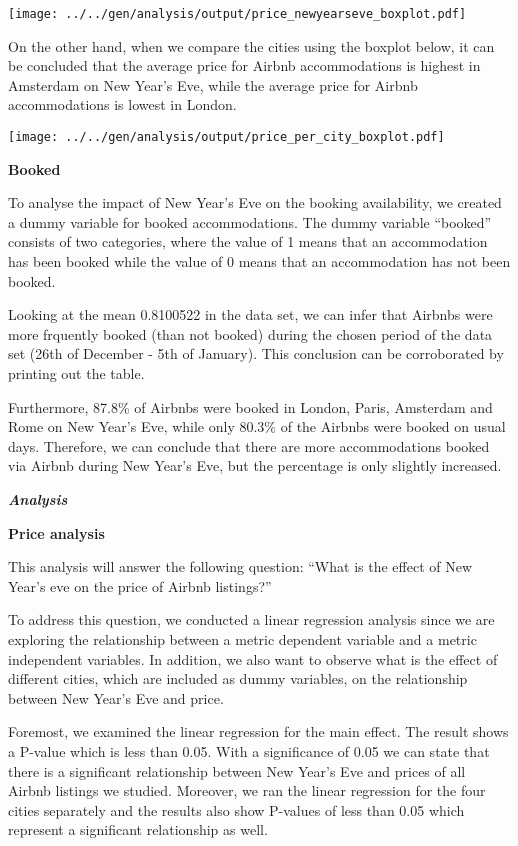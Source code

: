 \documentclass[
]{article}
\begin{document}
\texttt{[image: ../../gen/analysis/output/price\_newyearseve\_boxplot.pdf]}

On the other hand, when we compare the cities using the boxplot below,
it can be concluded that the average price for Airbnb accommodations is
highest in Amsterdam on New Year's Eve, while the average price for
Airbnb accommodations is lowest in London.

\texttt{[image: ../../gen/analysis/output/price\_per\_city\_boxplot.pdf]}

\textbf{Booked}

To analyse the impact of New Year's Eve on the booking availability, we
created a dummy variable for booked accommodations. The dummy variable
``booked'' consists of two categories, where the value of 1 means that
an accommodation has been booked while the value of 0 means that an
accommodation has not been booked.

Looking at the mean 0.8100522 in the data set, we can infer that Airbnbs
were more frquently booked (than not booked) during the chosen period of
the data set (26th of December - 5th of January). This conclusion can be
corroborated by printing out the table.

Furthermore, 87.8\% of Airbnbs were booked in London, Paris, Amsterdam
and Rome on New Year's Eve, while only 80.3\% of the Airbnbs were booked
on usual days. Therefore, we can conclude that there are more
accommodations booked via Airbnb during New Year's Eve, but the
percentage is only slightly increased.

\textbf{\emph{Analysis}}

\textbf{Price analysis}

This analysis will answer the following question: ``What is the effect
of New Year's eve on the price of Airbnb listings?''

To address this question, we conducted a linear regression analysis
since we are exploring the relationship between a metric dependent
variable and a metric independent variables. In addition, we also want
to observe what is the effect of different cities, which are included as
dummy variables, on the relationship between New Year's Eve and price.

Foremost, we examined the linear regression for the main effect. The
result shows a P-value which is less than 0.05. With a significance of
0.05 we can state that there is a significant relationship between New
Year's Eve and prices of all Airbnb listings we studied. Moreover, we
ran the linear regression for the four cities separately and the results
also show P-values of less than 0.05 which represent a significant
relationship as well.
\end{document}
